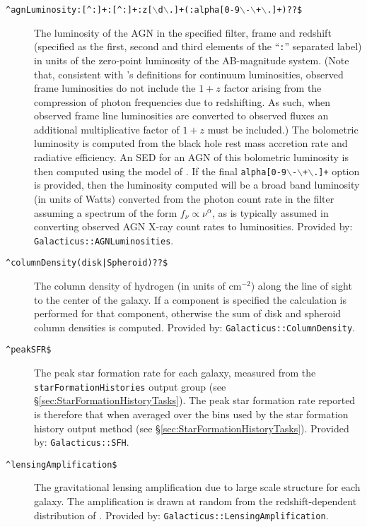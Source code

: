 \begin{description}
 \item[{\tt \textasciicircum agnLuminosity:[\textasciicircum:]+:[\textasciicircum:]+:z[$\backslash$d$\backslash$.]+(:alpha[0-9$\backslash$-$\backslash$+$\backslash$.]+)??\$}] The luminosity of the AGN in the specified filter, frame and redshift (specified as the first, second and third elements of the ``{\tt :}'' separated label) in units of the zero-point luminosity of the AB-magnitude system. (Note that, consistent with \glc's definitions for continuum luminosities, observed frame luminosities do not include the $1+z$ factor arising from the compression of photon frequencies due to redshifting. As such, when observed frame line luminosities are converted to observed fluxes an additional multiplicative factor of $1+z$ must be included.) The bolometric luminosity is computed from the black hole rest mass accretion rate and radiative efficiency. An SED for an AGN of this bolometric luminosity is then computed using the model of \cite{hopkins_observational_2007}. If the final {\tt alpha[0-9$\backslash$-$\backslash$+$\backslash$.]+} option is provided, then the luminosity computed will be a broad band luminosity (in units of Watts) converted from the photon count rate in the filter assuming a spectrum of the form $f_\nu \propto \nu^\alpha$, as is typically assumed in converting observed AGN X-ray count rates to luminosities. Provided by: {\tt Galacticus::AGNLuminosities}.


 \item[{\tt \textasciicircum columnDensity(disk|Spheroid)??\$}] The column density of hydrogen (in units of cm$^{-2}$) along the line of sight to the center of the galaxy. If a component is specified the calculation is performed for that component, otherwise the sum of disk and spheroid column densities is computed. Provided by: {\tt Galacticus::ColumnDensity}.



 \item[{\tt \textasciicircum peakSFR\$}] The peak star formation rate for each galaxy, measured from the {\tt starFormationHistories} output group  (see \S\ref{sec:StarFormationHistoryTasks}). The peak star formation rate reported is therefore that when averaged over the bins used by the star formation history output method (see \S\ref{sec:StarFormationHistoryTasks}). Provided by: {\tt Galacticus::SFH}.
 \item[{\tt \textasciicircum lensingAmplification\$}] The gravitational lensing amplification due to large scale structure for each galaxy. The amplification is drawn at random from the redshift-dependent distribution of \cite{takahashi_probability_2011}. Provided by: {\tt Galacticus::LensingAmplification}.
\end{description}

